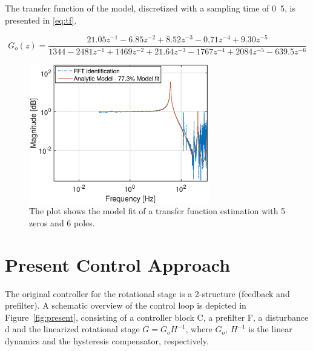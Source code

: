  The transfer function of the model, discretized with a sampling time of \unit{0.5}{\milli\second}, is presented in \eqref{eq:tf}.

\begin{equation}
  \label{eq:tf}
  G_o(z) = \frac{21.05z^{-1} - 6.85z^{-2} + 8.52z^{-3} - 0.71z^{-4} + 9.30z^{-5}}{1344 - 2481z^{-1} + 1469z^{-2} + 21.64z^{-3} - 1767z^{-4} + 2084z^{-5} - 639.5z^{-6}}
\end{equation}

\begin{figure}[h]
  \centering
  \includegraphics[width=0.7\textwidth]{fig/matlab/model.eps}
  \caption{\label{fig:model} The plot shows the model fit of a transfer function estimation with 5 zeros and 6 poles.}
\end{figure}

\section{Present Control Approach}
The original controller for the rotational stage is a 2-\abbrDOF structure (feedback and prefilter). A schematic overview of the control loop is depicted in Figure~\ref{fig:present}, consisting of a controller block C, a prefilter F, a disturbance d and the linearized rotational stage $G =G_oH^{-1}$, where $G_o$, $H^{-1}$ is the linear dynamics and the hysteresis compensator, respectively.

